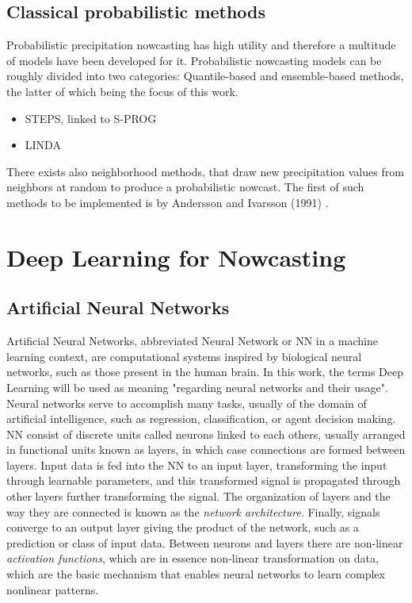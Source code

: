 \subsection{Classical probabilistic methods}

Probabilistic precipitation nowcasting has high utility and therefore a multitude of models have been developed for it. 
Probabilistic nowcasting models can be roughly divided into two categories: Quantile-based and ensemble-based methods, the latter of which being the focus of this work. 

\begin{itemize}
	\item STEPS, linked to S-PROG
	\item LINDA 
\end{itemize}

There exists also neighborhood methods, that draw new precipitation values from neighbors at random to produce a probabilistic nowcast. The first of such methods to be implemented is by Andersson and Ivarsson (1991) \cite{andersson_model_1991}. 





\section{Deep Learning for Nowcasting}

\subsection{Artificial Neural Networks}

Artificial Neural Networks, abbreviated Neural Network or NN in a machine learning context, are computational systems inspired by biological neural networks, such as those present in the human brain. In this work, the terms Deep Learning will be used as meaning "regarding neural networks and their usage". Neural networks serve to accomplish many tasks, usually of the domain of artificial intelligence, such as regression, classification, or agent decision making. NN consist of discrete units called neurons linked to each others, usually arranged in functional units known as layers, in which case connections are formed between layers. Input data is fed into the NN to an input layer, transforming the input through learnable parameters, and this transformed signal is propagated through other layers further transforming the signal. The organization of layers and the way they are connected is known as the \textit{network architecture}. Finally, signals converge to an output layer giving the product of the network, such as a prediction or class of input data. Between neurons and layers there are non-linear \textit{activation functions}, which are in essence non-linear transformation on data, which are the basic mechanism that enables neural networks to learn complex nonlinear patterns.

